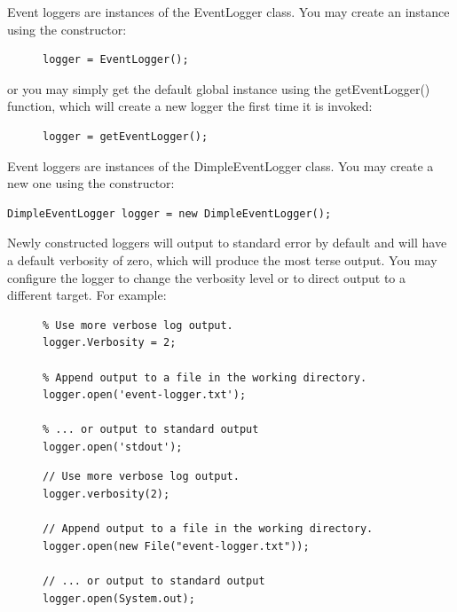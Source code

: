\ifmatlab
Event loggers are instances of the EventLogger class. You may create an
instance using the constructor:

\begin{figure}[H]
\begin{lstlisting}
logger = EventLogger();
\end{lstlisting}
\end{figure}

or you may simply get the default global instance using the getEventLogger() function, which will create a new logger the first time it is invoked:

\begin{figure}[H]
\begin{lstlisting}
logger = getEventLogger();
\end{lstlisting}
\end{figure}
\fi

\ifjava
Event loggers are instances of the DimpleEventLogger class. You may create a new one using the constructor:

\begin{lstlisting}
DimpleEventLogger logger = new DimpleEventLogger();
\end{lstlisting}
\fi

Newly constructed loggers will output to standard error by default and will have a default verbosity of zero, which will produce the most terse output. You may configure the logger to change the verbosity level or to direct output to a different target. For example:

\begin{figure}[H]
\ifmatlab
\begin{lstlisting}
% Use more verbose log output.
logger.Verbosity = 2;

% Append output to a file in the working directory.
logger.open('event-logger.txt');

% ... or output to standard output
logger.open('stdout');
\end{lstlisting}
\fi

\ifjava
\begin{lstlisting}
// Use more verbose log output.
logger.verbosity(2);

// Append output to a file in the working directory.
logger.open(new File("event-logger.txt"));

// ... or output to standard output
logger.open(System.out);
\end{lstlisting}
\fi
\end{figure}


